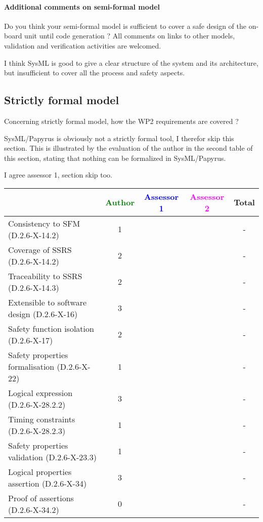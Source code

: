 \paragraph{Additional comments on semi-formal model} Do you think your semi-formal model is sufficient to cover a safe design of the on-board unit until code generation ?
All comments on links to other models, validation and verification activities are welcomed.


\begin{assessor2}
I think SysML is good to give a clear structure of the system and its architecture, but insufficient to cover all the process and safety aspects.
\end{assessor2}

\subsection{Strictly formal model}

Concerning strictly formal model, how the WP2 requirements are covered ?

\begin{assessor1}
SysML/Papyrus is obviously not a strictly formal tool, I therefor skip this section. 
This is illustrated by the evaluation of the author in the second table of this section, stating that nothing can be formalized in SysML/Papyrus. 
\end{assessor1}


\begin{assessor2}
I agree assessor 1, section skip too.
\end{assessor2}

\begin{tabular}{|l | c | c | c | c|}
\hline
& \textcolor{green}{Author} & \textcolor{blue}{Assessor 1} & \textcolor{magenta}{Assessor 2} & Total \\
\hline
Consistency to SFM (D.2.6-X-14.2) & 1 & & & - \\
\hline
Coverage of SSRS (D.2.6-X-14.2) & 2 & & & - \\
\hline
Traceability to SSRS (D.2.6-X-14.3) & 2 && & - \\
\hline
Extensible to software design (D.2.6-X-16) & 3 & & & - \\
\hline
Safety function isolation (D.2.6-X-17) & 2 & & & - \\
\hline
Safety properties formalisation (D.2.6-X-22) & 1 & & & - \\
\hline
Logical expression (D.2.6-X-28.2.2) & 3 & & & - \\
\hline
Timing constraints (D.2.6-X-28.2.3) & 1 & & & - \\
\hline
Safety properties validation (D.2.6-X-23.3) & 1 & & & - \\
\hline
Logical properties assertion (D.2.6-X-34) & 3 & & & - \\
\hline
Proof of assertions (D.2.6-X-34.2) & 0 & & & - \\
\hline
\end{tabular}

